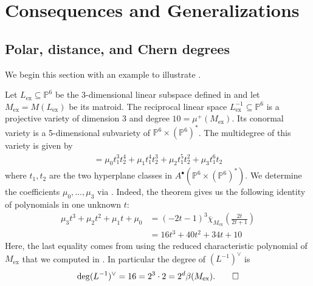 \documentclass[12pt,a4paper,english]{scrartcl}
\newcommand{\PP}{\mathbb{P}}
\DeclareMathOperator{\Con}{Con}
\begin{document}
\section{Consequences and Generalizations}
\label{sec:applications}

\subsection{Polar, distance, and Chern degrees}\label{sec:degreeexamples}

We begin this section with an example to illustrate .

\begin{example}
    Let $L_{\text{ex}}\subseteq \PP^6$ be the 3-dimensional linear subspace defined in  and let $M_{\text{ex}}=M(L_{\text{ex}})$ be its matroid. The reciprocal linear space $L_{\text{ex}}^{-1}\subseteq \PP^6$ is a projective variety of dimension 3 and degree $10=\mu^+(M_{\text{ex}})$. Its conormal variety is a 5-dimensional subvariety of $\PP^6\times (\PP^6)^*$. The multidegree of this variety is given by \begin{align*}
[\Con(L_{\text{ex}}^{-1})]=\mu_0t_1^3t_2^4+\mu_1t_1^4t_2^3+\mu_2t_1^5t_2^2+\mu_3t_1^6t_2
    \end{align*}
where $t_1,t_2$ are the two hyperplane classes in $A^\bullet(\PP^6 \times (\PP^6)^*)$. We determine the coefficients $\mu_0,\ldots,\mu_3$ via . Indeed, the theorem gives us the following identity of polynomials in one unknown $t$:
\begin{align*}
\mu_3t^3+\mu_2t^2+\mu_1t+\mu_0&=(-2t-1)^3\overline{\chi}_{M_{\text{ex}}}\left(\frac{2t}{2t+1}\right) \\
&=16t^3+40t^2+34t+10
\end{align*}
Here, the last equality comes from using the reduced characteristic polynomial of $M_{\text{ex}}$ that we computed in . In particular the degree of $(L^{-1})^\vee$ is 
\[
\deg(L^{-1})^\vee=16=2^3\cdot 2=2^d\beta(M_{\text{ex}}).\qedhere
\]
\end{example}
\end{document}

